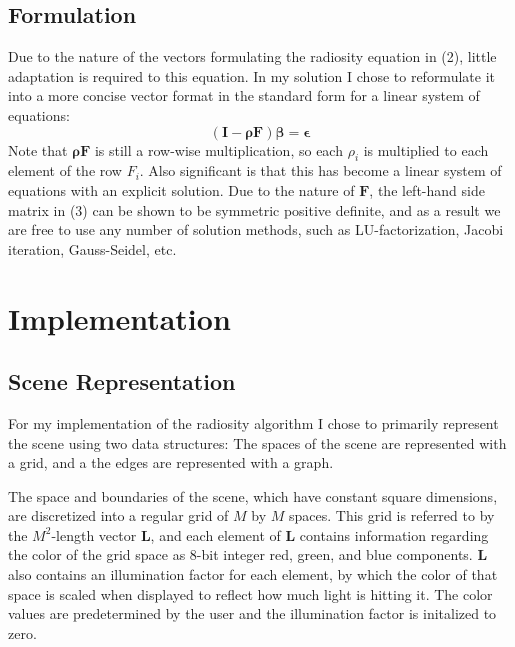\documentclass[letter]{article}
\newcommand{\vect}[1]{\boldsymbol{#1}}
\begin{document}
\subsection{Formulation}
Due to the nature of the vectors formulating the radiosity equation in (2), little adaptation is required to this equation. In my solution I chose to reformulate it into a more concise vector format in the standard form for a linear system of equations:
\begin{equation}
(\vect{I}-\vect{\rho} \vect{F})\vect{\beta}=\vect{\epsilon}
\end{equation}
Note that $\vect{\rho}\vect{F}$ is still a row-wise multiplication, so each $\rho_i$ is multiplied to each element of the row $F_i$. Also significant is that this has become a linear system of equations with an explicit solution. Due to the nature of $\vect{F}$, the left-hand side matrix in (3) can be shown to be symmetric positive definite, and as a result we are free to use any number of solution methods, such as LU-factorization, Jacobi iteration, Gauss-Seidel, etc.
\section{Implementation}
\subsection{Scene Representation}
For my implementation of the radiosity algorithm I chose to primarily represent the scene using two data structures: The spaces of the scene are represented with a grid, and a the edges are represented with a graph.

The space and boundaries of the scene, which have constant square dimensions, are discretized into a regular grid of $M$ by $M$ spaces. This grid is referred to by the $M^2$-length vector $\vect{L}$, and each element of $\vect{L}$ contains information regarding the color of the grid space as 8-bit integer red, green, and blue components. $\vect{L}$ also contains an illumination factor for each element, by which the color of that space is scaled when displayed to reflect how much light is hitting it. The color values are predetermined by the user and the illumination factor is initalized to zero.
\end{document}
